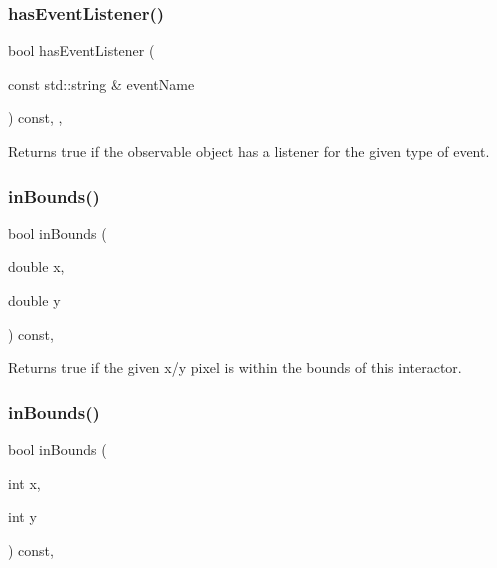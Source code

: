 \subsubsection{\texorpdfstring{has\+Event\+Listener()}{hasEventListener()}}
{\footnotesize\ttfamily bool has\+Event\+Listener (\begin{DoxyParamCaption}\item[{const std\+::string \&}]{event\+Name }\end{DoxyParamCaption}) const\hspace{0.3cm}{\ttfamily [protected]}, {\ttfamily [virtual]}, {\ttfamily [inherited]}}



Returns true if the observable object has a listener for the given type of event. 

\mbox{\label{classGInteractor_afc480f652b8c5f1fb255e2269ce68879}} 
\subsubsection{\texorpdfstring{in\+Bounds()}{inBounds()}\hspace{0.1cm}{\footnotesize\ttfamily [1/2]}}
{\footnotesize\ttfamily bool in\+Bounds (\begin{DoxyParamCaption}\item[{double}]{x,  }\item[{double}]{y }\end{DoxyParamCaption}) const\hspace{0.3cm}{\ttfamily [virtual]}, {\ttfamily [inherited]}}



Returns true if the given x/y pixel is within the bounds of this interactor. 

\mbox{\label{classGInteractor_ae6d7982c1c627b677a5e776ca86118ed}} 
\subsubsection{\texorpdfstring{in\+Bounds()}{inBounds()}\hspace{0.1cm}{\footnotesize\ttfamily [2/2]}}
{\footnotesize\ttfamily bool in\+Bounds (\begin{DoxyParamCaption}\item[{int}]{x,  }\item[{int}]{y }\end{DoxyParamCaption}) const\hspace{0.3cm}{\ttfamily [virtual]}, {\ttfamily [inherited]}}



